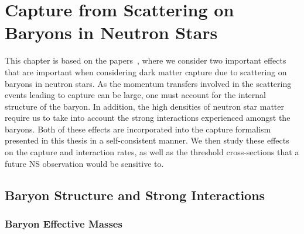\graphicspath{{img/capture_baryons/}}
\chapter{Capture from Scattering on Baryons in Neutron Stars}
\label{chapter:capture_baryons}

\begin{synopsis}
   This chapter is based on the papers~\cite{Bell:2020obw_sep_NucleonStructureStrong,Anzuini:2021lnv_nov_Improvedtreatmentdark}, where we consider two important effects that are important when considering dark matter capture due to scattering on baryons in neutron stars. 
   As the momentum transfers involved in the scattering events leading to capture can be large, one must account for the internal structure of the baryon. In addition, the high densities of neutron star matter require us to take into account the strong interactions experienced amongst the baryons. Both of these effects are incorporated into the capture formalism presented in this thesis in a self-consistent manner.
   We then study these effects on the capture and interaction rates, as well as the threshold cross-sections that a future NS observation would be sensitive to. 
\end{synopsis}


\section{Baryon Structure and Strong Interactions}
\label{ch5:sec:baryons_in_NSs}

\subsection{Baryon Effective Masses}
\label{ch5:subsec:strong_ints_meffs}

